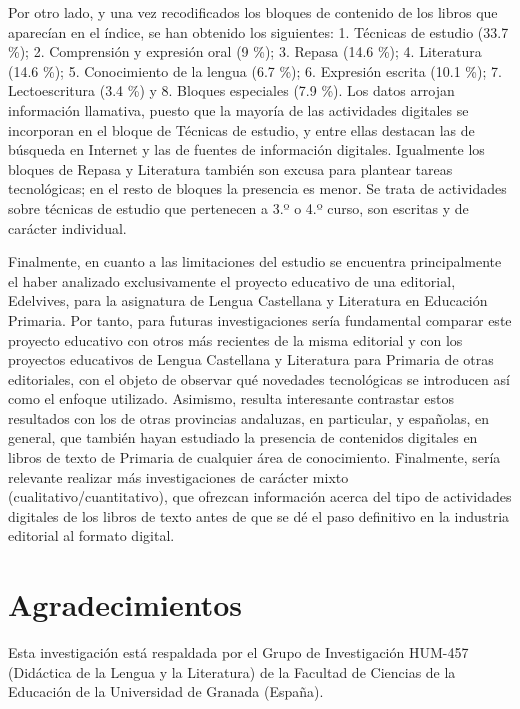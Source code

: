 \documentclass{textolivre}
\begin{document}
Por otro lado, y una vez recodificados los bloques de contenido de los libros que aparecían en el índice, se han obtenido los siguientes: 1. Técnicas de estudio (33.7 \%); 2. Comprensión y expresión oral (9 \%); 3. Repasa (14.6 \%); 4. Literatura (14.6 \%); 5. Conocimiento de la lengua (6.7 \%); 6. Expresión escrita (10.1 \%); 7. Lectoescritura (3.4 \%) y 8. Bloques especiales (7.9 \%). Los datos arrojan información llamativa, puesto que la mayoría de las actividades digitales se incorporan en el bloque de Técnicas de estudio, y entre ellas destacan las de búsqueda en Internet y las de fuentes de información digitales. Igualmente los bloques de Repasa y Literatura también son excusa para plantear tareas tecnológicas; en el resto de bloques la presencia es menor. Se trata de actividades sobre técnicas de estudio que pertenecen a 3.º o 4.º curso, son escritas y de carácter individual. 

Finalmente, en cuanto a las limitaciones del estudio se encuentra principalmente el haber analizado exclusivamente el proyecto educativo de una editorial, Edelvives, para la asignatura de Lengua Castellana y Literatura en Educación Primaria. Por tanto, para futuras investigaciones sería fundamental comparar este proyecto educativo con otros más recientes de la misma editorial y con los proyectos educativos de Lengua Castellana y Literatura para Primaria de otras editoriales, con el objeto de observar qué novedades tecnológicas se introducen así como el enfoque utilizado. Asimismo, resulta interesante contrastar estos resultados con los de otras provincias andaluzas, en particular, y españolas, en general, que también hayan estudiado la presencia de contenidos digitales en libros de texto de Primaria de cualquier área de conocimiento. Finalmente, sería relevante realizar más investigaciones de carácter mixto (cualitativo/cuantitativo), que ofrezcan información acerca del tipo de actividades digitales de los libros de texto antes de que se dé el paso definitivo en la industria editorial al formato digital.

\section{Agradecimientos}\label{sec-agradecimento}
Esta investigación está respaldada por el Grupo de Investigación HUM-457 (Didáctica de la Lengua y la Literatura) de la Facultad de Ciencias de la Educación de la Universidad de Granada (España).

\printbibliography\label{sec-bib}
\end{document}
